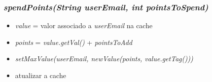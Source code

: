 \documentclass[a4paper]{article}
\begin{document}
\subsubsection{\textit{spendPoints(String userEmail, int pointsToSpend)}}
\begin{itemize}
\item \textit{value} = valor associado a \textit{userEmail} na cache
\item \textit{points} = \textit{value.getVal()} + \textit{pointsToAdd}
\item \textit{setMaxValue(userEmail, newValue(points, value.getTag()))}
\item atualizar a cache
\end{itemize}
\end{document}
